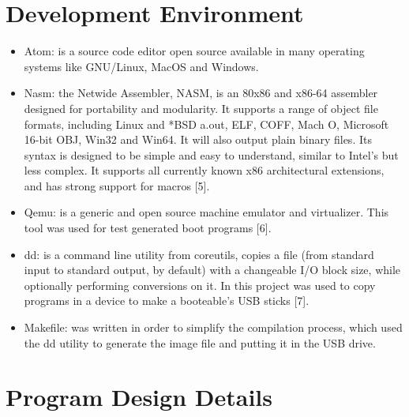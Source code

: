 \documentclass[11pt]{book}
\begin{document}

\newpage
\section*{Development Environment}

\begin{itemize}
    \item {Atom: is a source code editor open source available in many operating systems like GNU/Linux, MacOS and Windows.}
    
    \item {Nasm: the Netwide Assembler, NASM, is an 80x86 and x86-64 assembler designed for portability and modularity. It supports a range of object file formats, including Linux and *BSD a.out, ELF, COFF, Mach O, Microsoft 16-bit OBJ, Win32 and Win64. It will also output plain binary files. Its syntax is designed to be simple and easy to understand, similar to Intel’s but less complex. It supports all currently known x86 architectural extensions, and has strong support for macros [5].}
    
    \item {Qemu: is a generic and open source machine emulator and virtualizer. This tool was used for test generated boot programs [6].}
    
    \item {dd: is a command line utility from coreutils, copies a file (from standard input to standard output, by default) with a changeable I/O block size, while optionally performing conversions on it. In this project was used to copy programs in a device to make a booteable’s USB sticks [7].}
    
    \item {Makefile: was written in order to simplify the compilation process, which used the dd utility to generate the image file and putting it in the USB drive.}
\end{itemize}





\newpage
\section*{Program Design Details}
\end{document}
